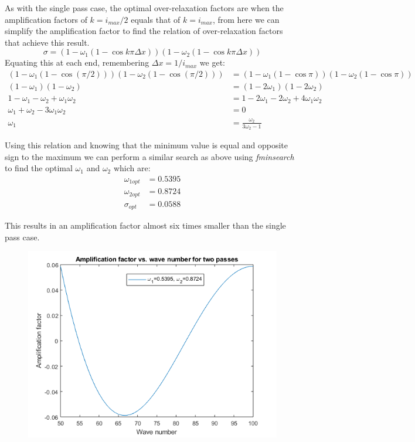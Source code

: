 \documentclass[12pt]{extarticle}
\begin{document}
\begin{enumerate}[(a)]
        As with the single pass case, the optimal over-relaxation factors are when the amplification factors of $k = i_{max}/2$ equals that of $k = i_{max}$, from here we can simplify the amplification factor to find the relation of over-relaxation factors that achieve this result.
        \vspace{-3mm}
        \begin{equation*}
            \sigma = (1 - \omega_1(1-\cos{k\pi\Delta x})) (1 - \omega_2(1-\cos{k\pi\Delta x}))
        \end{equation*}
        Equating this at each end, remembering $\Delta x = 1/i_{max}$ we get:
        \begin{align*}
            (1 - \omega_1(1-\cos(\pi/2)))(1 - \omega_2(1-\cos(\pi/2))) &= (1 - \omega_1(1-\cos{\pi}))(1 - \omega_2(1-\cos{\pi})) \\
            (1 - \omega_1) (1 - \omega_2) &= (1 - 2\omega_1) (1 - 2\omega_2) \\
            1 - \omega_1 - \omega_2 + \omega_1\omega_2 &= 1 - 2\omega_1 - 2\omega_2 + 4\omega_1\omega_2 \\
            \omega_1 + \omega_2 - 3\omega_1\omega_2 &= 0 \\
            \omega_1 &= \frac{\omega_2}{3\omega_2-1}
        \end{align*}
        
        Using this relation and knowing that the minimum value is equal and opposite sign to the maximum we can perform a similar search as above using \emph{fminsearch} to find the optimal $\omega_1$ and $\omega_2$ which are:
        \begin{align*}
            \omega_{1opt} &= 0.5395 \\
            \omega_{2opt} &= 0.8724 \\
            \sigma_{opt} &= 0.0588
        \end{align*}
        
        This results in an amplification factor almost six times smaller than the single pass case.
        
        \begin{figure}[h]
            \centering
            \includegraphics[scale = 0.7]{doublepass_amp_opt.png}
        \end{figure}
        

\end{enumerate}
\end{document}
